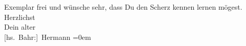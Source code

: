                Exemplar frei und wünsche sehr, dass Du den Scherz kennen lernen mögest.\pend
           \pstart
           Herzlichst{\\[\baselineskip]}Dein alter{\\[\baselineskip]}\spacefill\mbox{{[}hs. Bahr:{]} Hermann}\pend
           \leftskip=0em{}\endnumbering{}  
      